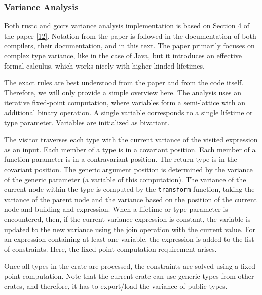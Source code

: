 \documentclass[
  11pt,
  twoside,symmetric]{report}
\begin{document}
\hypertarget{variance-analysis}{%
\subsubsection{Variance Analysis}\label{variance-analysis}}

Both rustc and gccrs variance analysis implementation is based on
Section 4 of the paper \protect\hyperlink{ref-Altidor2011}{{[}12{]}}.
Notation from the paper is followed in the documentation of both
compilers, their documentation, and in this text. The paper primarily
focuses on complex type variance, like in the case of Java, but it
introduces an effective formal calculus, which works nicely with
higher-kinded lifetimes.

The exact rules are best understood from the paper and from the code
itself. Therefore, we will only provide a simple overview here. The
analysis uses an iterative fixed-point computation, where variables form
a semi-lattice with an additional binary operation. A single variable
corresponds to a single lifetime or type parameter. Variables are
initialized as bivariant.

The visitor traverses each type with the current variance of the visited
expression as an input. Each member of a type is in a covariant
position. Each member of a function parameter is in a contravariant
position. The return type is in the covariant position. The generic
argument position is determined by the variance of the generic parameter
(a variable of this computation). The variance of the current node
within the type is computed by the \texttt{transform} function, taking
the variance of the parent node and the variance based on the position
of the current node and building and expression. When a lifetime or type
parameter is encountered, then, if the current variance expression is
constant, the variable is updated to the new variance using the join
operation with the current value. For an expression containing at least
one variable, the expression is added to the list of constraints. Here,
the fixed-point computation requirement arises.

Once all types in the crate are processed, the constraints are solved
using a fixed-point computation. Note that the current crate can use
generic types from other crates, and therefore, it has to export/load
the variance of public types.
\end{document}
